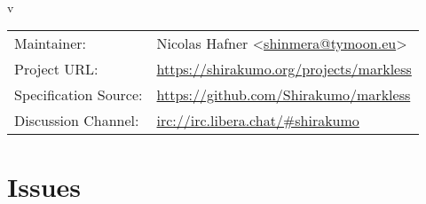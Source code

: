 \documentclass[12pt,a4paper,titlepage]{article}
\title{\doctitle}
\author{\docauthor}
\date{\d_mny\today}
\begin{document}
\begin{titlepage}
  \begin{center}
    \vspace*{5cm}
    {\bfseries\fontsize{32pt}{30pt}\selectfont\doctitle} \\
    \vspace{0.5cm}
    {\large v\gittag}
    \vfill
    \begin{tabular}{ll}
      Maintainer: & Nicolas Hafner <\href{mailto:shinmera@tymoon.eu}{shinmera@tymoon.eu}> \\
      Project URL: & \url{https://shirakumo.org/projects/markless} \\
      Specification Source: & \url{https://github.com/Shirakumo/markless} \\
      Discussion Channel: & \url{irc://irc.libera.chat/#shirakumo} \\
    \end{tabular}
  \end{center}
\end{titlepage}
\tableofcontents








\newpage\section*{Issues}\label{section:ISSUES}

\glsaddall
\newpage\label{section:GLOSSARY}\printglossaries
\end{document}
